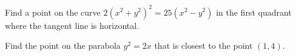 \documentclass[10pt]{amsart}
\begin{document}
\pagebreak

\begin{thm}[4 Points]
  Find a point on the curve $2(x^2 + y^2)^2 = 25(x^2 - y^2)$ in the first quadrant where the tangent line is horizontal.
  \vspace{1in}
\end{thm}
\begin{thm}
  Find the point on the parabola $y^2 = 2x$ that is closest to the point $(1,4)$.
\end{thm}
\end{document}
